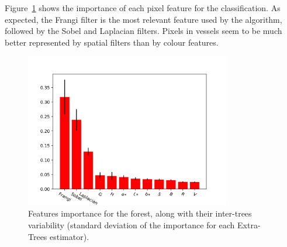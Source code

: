 Figure~\ref{fig:importance} shows the importance of each pixel feature for the classification. As expected, the Frangi filter is the most relevant feature used by the algorithm, followed by the Sobel and Laplacian filters. Pixels in vessels seem to be much better represented by spatial filters than by colour features.

\begin{figure}
  \centering
  \includegraphics[width=0.8\textwidth]{figures/importances}
  \caption{Features importance for the forest, along with their inter-trees variability (standard deviation of the importance for each Extra-Trees estimator).} \label{fig:importance}
\end{figure}
